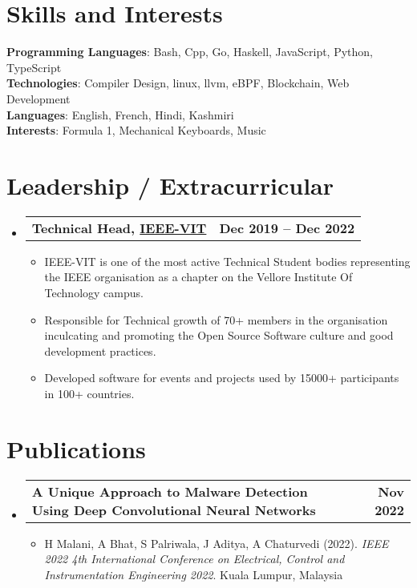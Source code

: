 \documentclass[a4paper,11pt]{article}
\makeatletter
\newcommand{\resumeItem}[1]{
  \item\small{
    {#1 \vspace{-2pt}}
  }
}
\newcommand{\resumeSubheadingg}[2]{
  \vspace{-2pt}\item
    \begin{tabular*}{1.0\textwidth}[t]{l@{\extracolsep{\fill}}r}
      \textbf{#1} & \textbf{\small #2} \\
    \end{tabular*}\vspace{-7pt}
}
\newcommand{\resumeSubHeadingListStart}{\begin{itemize}[leftmargin=0.0in, label={}]}
\newcommand{\resumeSubHeadingListEnd}{\end{itemize}}
\newcommand{\resumeItemListStart}{\begin{itemize}}
\newcommand{\resumeItemListEnd}{\end{itemize}\vspace{-5pt}}
\makeatother
\begin{document}
%
\section{Skills and Interests}
 \begin{itemize}[leftmargin=0.15in, label={}]
    \small{\item{
     \textbf{Programming Languages}{: Bash, Cpp, Go, Haskell, JavaScript, Python, TypeScript} \\
     \textbf{Technologies}{: Compiler Design, linux, llvm, eBPF, Blockchain, Web Development} \\
     \textbf{Languages}{: English, French, Hindi, Kashmiri} \\
     \textbf{Interests}{: Formula 1, Mechanical Keyboards, Music} \\
    }}
 \end{itemize}
 \vspace{-16pt}

\section{Leadership / Extracurricular}
    \resumeSubHeadingListStart
        \resumeSubheadingg{{Technical Head, \href{https://ieeevit.org}{IEEE-VIT}}}{Dec 2019 -- Dec 2022}
            \resumeItemListStart
                \resumeItem{IEEE-VIT is one of the most active Technical Student bodies representing the IEEE organisation as a chapter on the Vellore Institute Of Technology campus.}
                \resumeItem{Responsible for Technical growth of 70+ members in the organisation inculcating and promoting the Open Source Software culture and good development practices.}
                \resumeItem{Developed software for events and projects used by 15000+ participants in 100+ countries.}
            \resumeItemListEnd
    \resumeSubHeadingListEnd
    
\section{Publications}
  \resumeSubHeadingListStart
    \resumeSubheadingg
      {A Unique Approach to Malware Detection Using Deep Convolutional Neural Networks}{Nov 2022}
      \resumeItemListStart
        \resumeItem{H Malani, A Bhat, S Palriwala, J Aditya, A Chaturvedi (2022). \textit{IEEE 2022 4th International Conference on Electrical, Control and Instrumentation Engineering 2022}. Kuala Lumpur, Malaysia}
    \resumeItemListEnd
  \resumeSubHeadingListEnd
\end{document}
